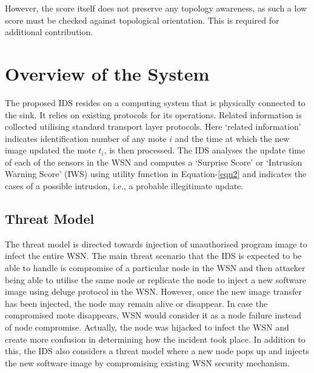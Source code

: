 \documentclass[conference,final]{IEEEtran}
\begin{document}
However, the score itself does not preserve any topology awareness, as such a low score must be checked against topological orientation.
This is required for additional contribution.


\section{Overview of the System}
\label{sec:des}
The proposed IDS resides on a computing system that is physically connected to the sink.
It relies on existing protocols for its operations.
Related information is collected utilising standard transport layer protocols. 
Here `related information' indicates identification number of any mote $i$ and the time at which the new image updated the mote $t_i$, is then processed.
The IDS analyses the update time of  each of the sensors in the WSN and computes a `Surprise Score' or `Intrusion Warning Score' (IWS) using utility function in Equation-\ref{eqn2} and indicates the cases of a possible intrusion, i.e., a probable illegitimate update.

\subsection{Threat Model}


The threat model is directed towards injection of unauthorised program image to infect the entire WSN.
The main threat scenario that the IDS is expected to be able to handle is compromise of a particular node in the WSN and then attacker being able to utilise the same node or replicate the node to inject a new software image using deluge protocol in the WSN.
However, once the new image transfer has been injected, the node may remain alive or disappear.
In case the compromised mote disappears, WSN would consider it as a node failure instead of node compromise.
Actually, the node was hijacked to infect the WSN and create more confusion in determining how the incident took place.
In addition to this, the IDS also considers a threat model where a new node pops up and injects the new software image by compromising existing WSN security mechanism.
\end{document}
